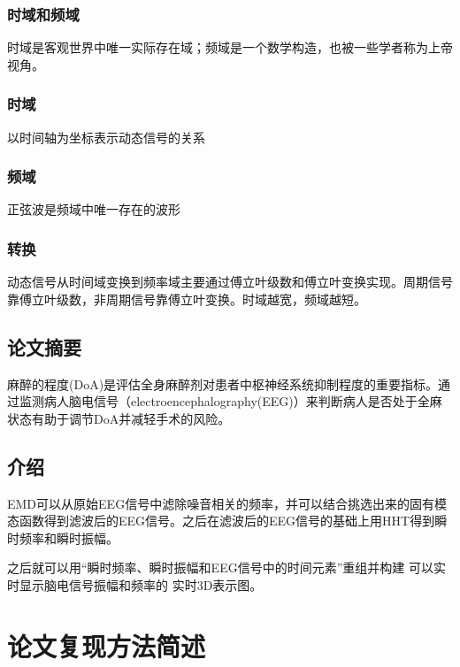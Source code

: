 \documentclass[cs4size,a4paper]{ctexart}
\numberwithin{equation}{section}
\numberwithin{table}{section}
\numberwithin{figure}{section}
\begin{document}
\subsubsection{时域和频域}

时域是客观世界中唯一实际存在域；频域是一个数学构造，也被一些学者称为上帝视角。

\subsubsection{时域}

以时间轴为坐标表示动态信号的关系

\subsubsection{频域}

正弦波是频域中唯一存在的波形

\subsubsection{转换}

动态信号从时间域变换到频率域主要通过傅立叶级数和傅立叶变换实现。周期信号靠傅立叶级数，非周期信号靠傅立叶变换。时域越宽，频域越短。

\subsection{论文摘要}

麻醉的程度(DoA)是评估全身麻醉剂对患者中枢神经系统抑制程度的重要指标。通过监测病人脑电信号（electroencephalography(EEG)）来判断病人是否处于全麻状态有助于调节DoA并减轻手术的风险。

\subsection{介绍}

EMD可以从原始EEG信号中滤除噪音相关的频率，并可以结合挑选出来的固有模态函数得到滤波后的EEG信号。之后在滤波后的EEG信号的基础上用HHT得到瞬时频率和瞬时振幅。

之后就可以用“瞬时频率、瞬时振幅和EEG信号中的时间元素”重组并构建 可以实时显示脑电信号振幅和频率的 实时3D表示图。

\section{论文复现方法简述}
\end{document}
